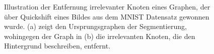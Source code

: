\begin{figure}[t]
\centering
{}
\hspace{1cm}
\caption[Entfernung irrelevanter Knoten]{Illustration der Entfernung irrelevanter Knoten eines Graphen, der über Quickshift eines Bildes aus dem \gls{MNIST} Datensatz gewonnen wurde.
(a) zeigt den Ursprungsgraphen der Segmentierung, wohingegen der Graph in (b) die irrelevanten Knoten, die den Hintergrund beschreiben, entfernt.}
\label{fig:knotenentfernung}
\end{figure}
